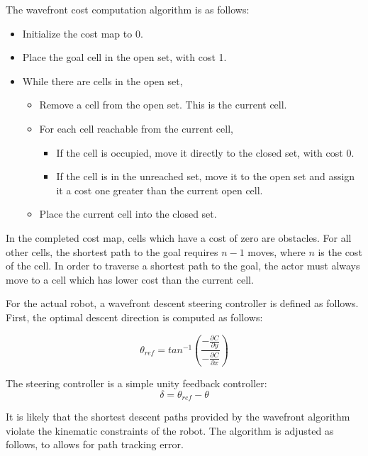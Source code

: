\documentclass[11pt]{article} %
\begin{document}
The wavefront cost computation algorithm is as follows:

\begin{itemize}
 \item Initialize the cost map to 0.
 \item Place the goal cell in the open set, with cost 1.
 \item While there are cells in the open set, \begin{itemize}
  \item Remove a cell from the open set.  This is the current cell.
  \item For each cell reachable from the current cell, \begin{itemize}
    \item If the cell is occupied, move it directly to the closed set, with cost 0.
    \item If the cell is in the unreached set, move it to the open set and assign it a cost one greater than the current open cell.
  \end{itemize}
  \item Place the current cell into the closed set.
 \end{itemize}
\end{itemize}

In the completed cost map, cells which have a cost of zero are obstacles.  For all other cells, the shortest path to the goal requires $n-1$ moves, where $n$ is the cost of the cell.  In order to traverse a shortest path to the goal, the actor must always move to a cell which has lower cost than the current cell.

For the actual robot, a wavefront descent steering controller is defined as follows.  First, the optimal descent direction is computed as follows:

\begin{equation}
\theta_{ref} = tan^{-1}( \frac{ - \frac{\partial C}{\partial y} }{ - \frac{\partial C}{\partial x} } )
\end{equation}

The steering controller is a simple unity feedback controller:
\begin{equation}
\delta = \theta_{ref} - \theta 
\end{equation}

It is likely that the shortest descent paths provided by the wavefront algorithm violate the kinematic constraints of the robot.  The algorithm is adjusted as follows, to allows for path tracking error.  
\end{document}
